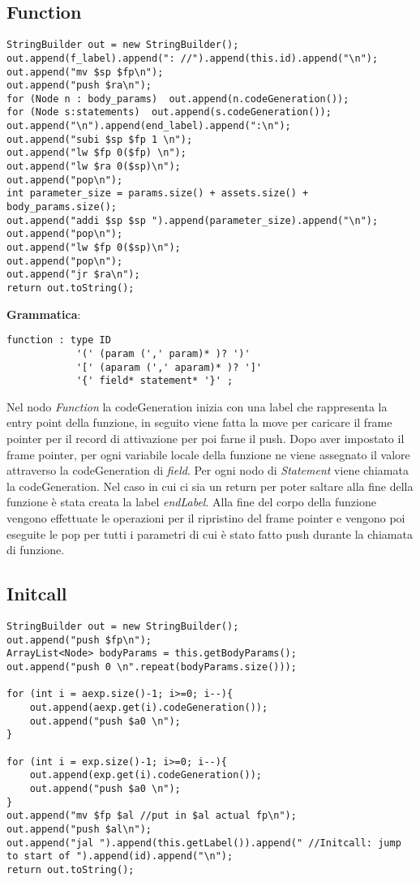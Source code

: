 \documentclass[12pt,twoside,openright,a4paper]{report}
\begin{document}
\newpage
\subsection{Function}
\begin{lstlisting}
StringBuilder out = new StringBuilder();
out.append(f_label).append(": //").append(this.id).append("\n");
out.append("mv $sp $fp\n");
out.append("push $ra\n");
for (Node n : body_params)  out.append(n.codeGeneration()); 
for (Node s:statements)  out.append(s.codeGeneration()); 
out.append("\n").append(end_label).append(":\n");
out.append("subi $sp $fp 1 \n");
out.append("lw $fp 0($fp) \n");
out.append("lw $ra 0($sp)\n");
out.append("pop\n");
int parameter_size = params.size() + assets.size() + body_params.size();
out.append("addi $sp $sp ").append(parameter_size).append("\n");
out.append("pop\n");
out.append("lw $fp 0($sp)\n");	
out.append("pop\n");
out.append("jr $ra\n");
return out.toString();
\end{lstlisting}
\textbf{Grammatica}: 
\begin{lstlisting}
function : type ID 
            '(' (param (',' param)* )? ')'
            '[' (aparam (',' aparam)* )? ']'
	        '{' field* statement* '}' ; 
\end{lstlisting}
Nel nodo \textit{Function} la codeGeneration inizia con una label che rappresenta la entry point della funzione, in seguito viene fatta la move per caricare il frame pointer per il record di attivazione per poi farne il push.
Dopo aver impostato il frame pointer, per ogni variabile locale della funzione ne viene assegnato il valore attraverso la codeGeneration di \textit{field}.
\newline Per ogni nodo di \textit{Statement} viene chiamata la codeGeneration. Nel caso in cui ci sia un return per poter saltare alla fine della funzione è stata creata la label \textit{endLabel}. \newline
Alla fine del corpo della funzione vengono effettuate le operazioni per il ripristino del frame pointer e vengono poi eseguite le pop per tutti i parametri di cui è stato fatto push durante la chiamata di funzione.

\newpage
\subsection{Initcall}
\begin{lstlisting}
StringBuilder out = new StringBuilder();
out.append("push $fp\n");
ArrayList<Node> bodyParams = this.getBodyParams();
out.append("push 0 \n".repeat(bodyParams.size()));

for (int i = aexp.size()-1; i>=0; i--){
    out.append(aexp.get(i).codeGeneration());
    out.append("push $a0 \n");
}

for (int i = exp.size()-1; i>=0; i--){
    out.append(exp.get(i).codeGeneration());
    out.append("push $a0 \n");
}
out.append("mv $fp $al //put in $al actual fp\n");
out.append("push $al\n");
out.append("jal ").append(this.getLabel()).append(" //Initcall: jump to start of ").append(id).append("\n");
return out.toString();
\end{lstlisting}
\end{document}
